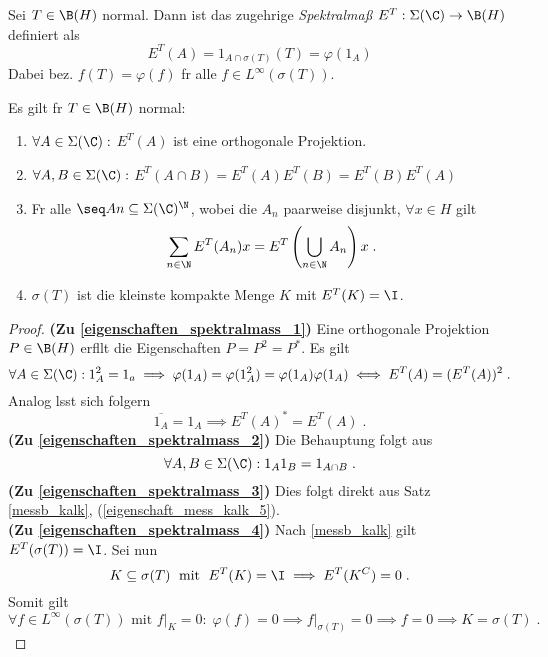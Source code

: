 \begin{definition}
	Sei \(T\in \B(H)\) normal. Dann ist das zugeh\os rige \textit{Spektralma\ss{}} \(E^T: \Sigma(\C) \to \B(H)\) definiert als
	\[E^T(A) = 1_{A\cap \sigma(T)}(T) = \varphi(1_A)\]
	Dabei bez. \(f(T) = \varphi(f)\) f\us r alle \( f \in L^\infty(\sigma(T))\).
\end{definition}

\begin{theorem}
	Es gilt f\us r \(T\in \B(H)\) normal:
	\end{theorem}
	\begin{enumerate}
		\item \(\forall A \in \Sigma(\C):\) \(E^T(A)\) ist eine orthogonale Projektion. \label{eigenschaften_spektralmass_1}
		\item \(\forall A, B \in \Sigma(\C):\) \(E^T(A\cap B) = E^T(A)E^T(B) = E^T(B)E^T(A)\)\label{eigenschaften_spektralmass_2}
		\item F\us r alle \(\seq An \subseteq \Sigma(\C)^\N\), wobei die $A_n$ paarweise disjunkt, \(\forall x \in H\) gilt \label{eigenschaften_spektralmass_3}
		\[\sum_{n\in\N}E^T(A_n)x = E^T\left(\bigcup_{n\in\N} A_n\right)x\;.\]
		\item \(\sigma(T)\) ist die kleinste kompakte Menge $K$ mit \(E^T(K)= \I\).\label{eigenschaften_spektralmass_4}
	\end{enumerate}
	\begin{proof}
		\textbf{(Zu \ref{eigenschaften_spektralmass_1})} Eine orthogonale Projektion $P\in\B(H)$ erf\us llt die Eigenschaften $P= P^2 = P^*$. Es gilt 
		\[\forall A \in \Sigma(\C): 1_A^2 = 1_a \implies \varphi(1_A) = \varphi(1_A^2) = \varphi(1_A) \varphi(1_A)  \iff E^T(A) = (E^T(A))^2\;.\]
		Analog l\as sst sich folgern
		\[\overline{1_A} = 1_A \implies E^T(A)^* = E^T(A)\;.\]
		\textbf{(Zu \ref{eigenschaften_spektralmass_2})} Die Behauptung folgt aus 
		\[\forall A, B \in \Sigma(\C): 1_A1_B = 1_{A\cap B}\;.\]
		\textbf{(Zu \ref{eigenschaften_spektralmass_3})} Dies folgt direkt aus Satz \ref{messb_kalk}, (\ref{eigenschaft_mess_kalk_5}).\\
		\textbf{(Zu \ref{eigenschaften_spektralmass_4})} Nach \ref{messb_kalk} gilt \(E^T(\sigma(T)) = \I\). Sei nun 
		\[K \subseteq \sigma(T) \;\text{ mit } \; E^T(K) = \I \implies E^T(K^C) = 0\;.\]
		Somit gilt 
		\[\forall f \in L^\infty(\sigma(T)) \text{ mit } f\vert_K = 0:\; \varphi(f) = 0 \implies f\vert_{\sigma(T)} = 0 \implies f=0 \implies K = \sigma(T)\;.\]
	\end{proof}
	
